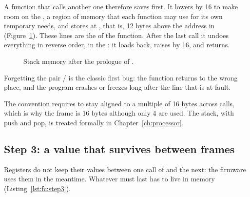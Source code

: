 A function that calls another one therefore saves  first. It lowers
 by 16 to make room on the , a region of memory that each
function may use for its own temporary needs, and stores  at
, that is, 12 bytes above the address in 
(Figure~\ref{fig:fc:stack}). These lines are the  of the
function. After the last call it undoes everything in reverse order, in the
: it loads  back, raises  by 16, and returns.

\begin{figure}[htb]
\centering
{}
\caption{Stack memory after the prologue of .}
\label{fig:fc:stack}
\end{figure}

\begin{prgwarn}
Forgetting the pair / is the classic first bug: the
function returns to the wrong place, and the program crashes or freezes long
after the line that is at fault.
\end{prgwarn}

The convention requires  to stay aligned to a multiple of 16 bytes
across calls, which is why the frame is 16 bytes although only 4 are used.
The stack, with push and pop, is treated formally in
Chapter~\ref{ch:processor}.

\subsection{Step 3: a value that survives between frames}

Registers do not keep their values between one call of  and the
next: the firmware uses them in the meantime. Whatever must last has to live
in memory (Listing~\ref{lst:fc:step3}).

